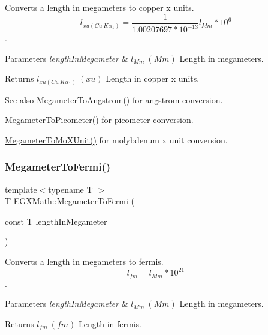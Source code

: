Converts a length in megameters to copper x units. \[ l_{xu(Cu\ K\alpha_1)}= \frac{1}{1.00207697*10^{-13}} l_{Mm} * 10^{6}\]. 


\begin{DoxyParams}{Parameters}
{\em length\+In\+Megameter} & $ l_{Mm}\ (Mm)$ Length in megameters. \\
\hline
\end{DoxyParams}
\begin{DoxyReturn}{Returns}
$ l_{xu(Cu\ K\alpha_1)}\ (xu)$ Length in copper x units. 
\end{DoxyReturn}
\begin{DoxySeeAlso}{See also}
\mbox{\hyperlink{group___e_g_x_math-_conversions-_length_conversions-_s_i-_megameter-_non-_s_i_gac4c7e615f4ec3d000ac341a5bf9a79a0}{Megameter\+To\+Angstrom()}} for angstrom conversion. 

\mbox{\hyperlink{group___e_g_x_math-_conversions-_length_conversions-_s_i-_megameter-_s_i_ga0f6585bdcd16b6748b6c4d9116dd955c}{Megameter\+To\+Picometer()}} for picometer conversion. 

\mbox{\hyperlink{group___e_g_x_math-_conversions-_length_conversions-_s_i-_megameter-_non-_s_i_ga134a9fb2603b93c739c4ee58864f69c6}{Megameter\+To\+Mo\+X\+Unit()}} for molybdenum x unit conversion. 
\end{DoxySeeAlso}
\mbox{\label{group___e_g_x_math-_conversions-_length_conversions-_s_i-_megameter-_non-_s_i_ga74f07a7c24ffe784415fb3d33a3b5bec}} 
\subsubsection{\texorpdfstring{Megameter\+To\+Fermi()}{MegameterToFermi()}}
{\footnotesize\ttfamily template$<$typename T $>$ \\
T E\+G\+X\+Math\+::\+Megameter\+To\+Fermi (\begin{DoxyParamCaption}\item[{const T}]{length\+In\+Megameter }\end{DoxyParamCaption})}



Converts a length in megameters to fermis. \[ l_{fm}=l_{Mm} * 10^{21} \]. 


\begin{DoxyParams}{Parameters}
{\em length\+In\+Megameter} & $ l_{Mm}\ (Mm)$ Length in megameters. \\
\hline
\end{DoxyParams}
\begin{DoxyReturn}{Returns}
$ l_{fm}\ (fm)$ Length in fermis. 
\end{DoxyReturn}
\mbox{\label{group___e_g_x_math-_conversions-_length_conversions-_s_i-_megameter-_non-_s_i_ga14e6b356b28257b1bde9cb9ebf6bc3c6}} 
